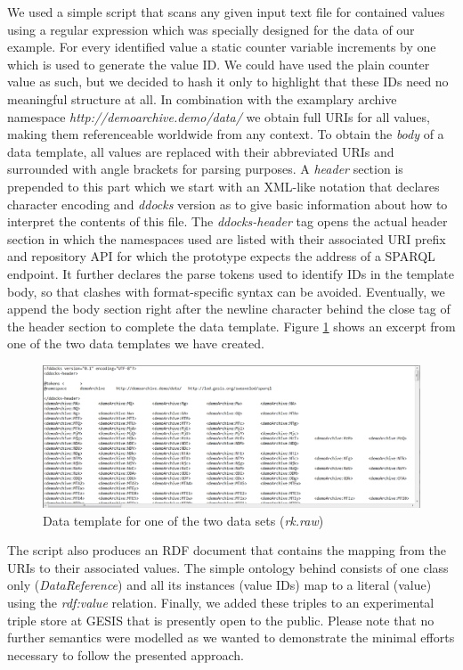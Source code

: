 \documentclass{acm_proc_article-sp}
\begin{document}
We used a simple script that scans any given input text file for contained values using a regular expression which was specially designed for the data of our example.
For every identified value a static counter variable increments by one which is used to generate the value ID.
We could have used the plain counter value as such, but we decided to hash it only to highlight that these IDs need no meaningful structure at all.
In combination with the examplary archive namespace \textit{http://demoarchive.demo/data/} we obtain full URIs for all values, making them referenceable worldwide from any context.
To obtain the \textit{body} of a data template, all values are replaced with their abbreviated URIs and surrounded with angle brackets for parsing purposes.
A \textit{header} section is prepended to this part which we start with an XML-like notation that declares character encoding and \textit{ddocks} version as to give basic information about how to interpret the contents of this file.
The \textit{ddocks-header} tag opens the actual header section in which the namespaces used are listed with their associated URI prefix and repository API for which the prototype expects the address of a SPARQL endpoint.
It further declares the parse tokens used to identify IDs in the template body, so that clashes with format-specific syntax can be avoided.
Eventually, we append the body section right after the newline character behind the close tag of the header section to complete the data template.
Figure \ref{fig:datatemplate} shows an excerpt from one of the two data templates we have created.



\begin{figure}[htb]
\centering
\includegraphics[width=.95\textwidth]{img/datatemplate.png}
\caption{
Data template for one of the two data sets (\textit{rk.raw})
}
\label{fig:datatemplate}
\end{figure}


The script also produces an RDF document that contains the mapping from the URIs to their associated values.
The simple ontology behind consists of one class only (\textit{DataReference}) and all its instances (value IDs) map to a literal (value) using the \textit{rdf:value} relation.
Finally, we added these triples to an experimental triple store at GESIS that is presently open to the public.
Please note that no further semantics were modelled as we wanted to demonstrate the minimal efforts necessary to follow the presented approach.
\end{document}
